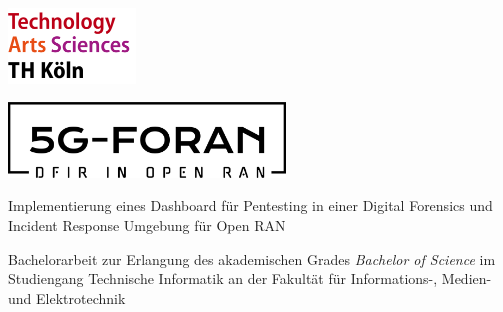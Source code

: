 \begin{titlepage}
    \begin{center}
        \begin{minipage}[c]{0.33\textwidth}
            \includegraphics[height=2cm]{images/th_koeln.png} %
        \end{minipage}%
        \hfill
        \begin{minipage}[c]{0.1\textwidth}
        \end{minipage}%
        \hfill
        \begin{minipage}[c]{0.52\textwidth}
            \includegraphics[height=2cm]{images/foran.png} %
        \end{minipage}
    \end{center}
    \vfill
    \begin{center}
        \huge Implementierung eines Dashboard für Pentesting in einer Digital Forensics und Incident Response Umgebung für Open RAN\\[10mm]
    \end{center}
    Bachelorarbeit zur Erlangung des akademischen Grades\newline
    \emph{Bachelor of Science}\newline
    im Studiengang Technische Informatik\newline
    an der Fakultät für Informations-, Medien- und Elektrotechnik\newline

\end{titlepage}
